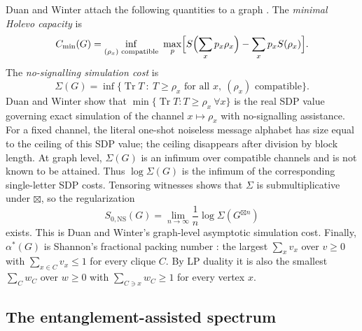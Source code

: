 \documentclass[11pt]{article}
\theoremstyle{definition}
\DeclareMathOperator{\Tr}{Tr}
\newcommand{\Cmin}{C_{\min}}
\newcommand{\SNS}{S_{0,\mathrm{NS}}}
\newcommand{\boxt}{\boxtimes}
\begin{document}
Duan and Winter attach the following quantities to a graph
\cite{DuanWinter2016}.  The \emph{minimal Holevo capacity} is
\begin{equation}\label{eq:cmin-def}
 \Cmin(G)=\inf_{(\rho_x)\text{ compatible}}\ \max_p
  \Bigl[S\Bigl(\sum_xp_x\rho_x\Bigr)-\sum_xp_xS(\rho_x)\Bigr].
\end{equation}
The \emph{no-signalling simulation cost} is
\begin{equation}\label{eq:sigma-def}
 \Sigma(G)=\inf\bigl\{\Tr T\ :\ T\ge\rho_x\text{ for all }x,\
   (\rho_x)\text{ compatible}\bigr\}.
\end{equation}
Duan and Winter show that $\min\{\Tr T:T\ge\rho_x\ \forall x\}$ is the real
SDP value governing exact simulation of the channel $x\mapsto\rho_x$ with
no-signalling assistance.  For a fixed channel, the literal one-shot
noiseless message alphabet has size equal to the ceiling of this SDP value;
the ceiling disappears after division by block length.  At graph level,
$\Sigma(G)$ is an infimum over compatible channels and is not known to be
attained.
Thus $\log\Sigma(G)$ is the infimum of the corresponding single-letter SDP
costs.  Tensoring witnesses shows that $\Sigma$ is
submultiplicative under $\boxt$, so the regularization
\[
 \SNS(G)=\lim_{n\to\infty}\frac1n\log\Sigma(G^{\boxt n})
\]
exists.  This is Duan and Winter's graph-level asymptotic simulation cost.
Finally, $\alpha^*(G)$ is Shannon's fractional packing number
\cite{Shannon1956}: the largest
$\sum_xv_x$ over $v\ge0$ with $\sum_{x\in C}v_x\le1$ for every clique $C$.  By
LP duality it is also the smallest $\sum_Cw_C$ over $w\ge0$ with
$\sum_{C\ni x}w_C\ge1$ for every vertex $x$.

\subsection{The entanglement-assisted spectrum}
\end{document}
